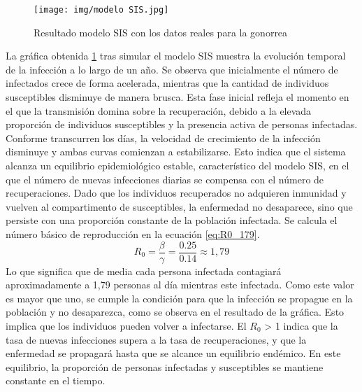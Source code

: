 \begin{figure}[H]
    \centering
    \texttt{[image: img/modelo SIS.jpg]}
    \caption{Resultado modelo SIS con los datos reales para la gonorrea}
    \label{fig:simugono}
    
\end{figure}

La gráfica obtenida \ref{fig:simugono} tras simular el modelo SIS muestra la evolución temporal de la infección a lo largo de un año. Se observa que inicialmente el número de infectados crece de forma acelerada, mientras que la cantidad de individuos susceptibles disminuye de manera brusca. Esta fase inicial refleja el momento en el que la transmisión domina sobre la recuperación, debido a la elevada proporción de individuos susceptibles y la presencia activa de personas infectadas.
Conforme transcurren los días, la velocidad de crecimiento de la infección disminuye y ambas curvas comienzan a estabilizarse. Esto indica que el sistema alcanza un equilibrio epidemiológico estable, característico del modelo SIS, en el que el número de nuevas infecciones diarias se compensa con el número de recuperaciones. Dado que los individuos recuperados no adquieren inmunidad y vuelven al compartimento de susceptibles, la enfermedad no desaparece, sino que persiste con una proporción constante de la población infectada.
Se calcula el número básico de reproducción en la ecuación \eqref{eq:R0_179}.
\begin{equation}
R_0 = \frac{\beta}{\gamma} = \frac{0.25}{0.14} \approx 1{,}79
\label{eq:R0_179}
\end{equation}
Lo que significa que de media cada persona infectada contagiará aproximadamente a 1,79 personas al día mientras este infectada. Como este valor es mayor que uno, se cumple la condición para que la infección se propague en la población y no desaparezca, como se observa en el resultado de la gráfica. Esto implica que los individuos pueden volver a infectarse. El $R_0$ > 1 indica que la tasa de nuevas infecciones supera a la tasa de recuperaciones, y que la enfermedad se propagará hasta que se alcance un equilibrio endémico. En este equilibrio, la proporción de personas infectadas y susceptibles se mantiene constante en el tiempo.





